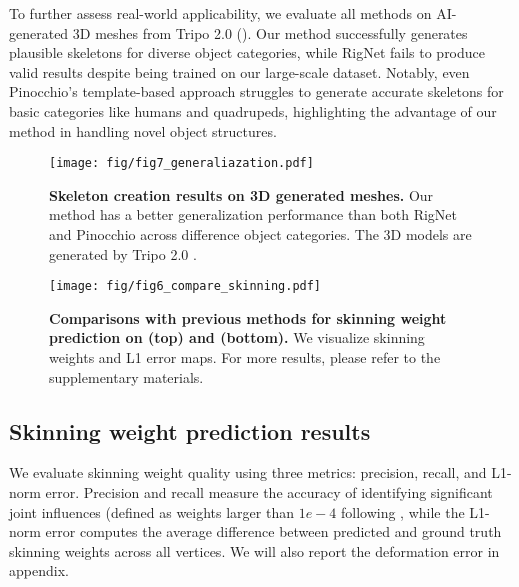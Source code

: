To further assess real-world applicability, we evaluate all methods on AI-generated 3D meshes from Tripo 2.0 \cite{tripo3d} (). 
Our method successfully generates plausible skeletons for diverse object categories, while RigNet fails to produce valid results despite being trained on our large-scale dataset. 
Notably, even Pinocchio's template-based approach struggles to generate accurate skeletons for basic categories like humans and quadrupeds, highlighting the advantage of our method in handling novel object structures.


\begin{figure}
  \centering
  \texttt{[image: fig/fig7\_generaliazation.pdf]}
  \caption{\textbf{Skeleton creation results on 3D generated meshes.} Our method has a better generalization performance than both RigNet \cite{xu2020rignet} and Pinocchio \cite{baran2007automatic} across difference object categories. The 3D models are generated by Tripo 2.0 \cite{tripo3d}.}
  \label{generalization}
\end{figure}


\begin{figure*}
  \centering
  \texttt{[image: fig/fig6\_compare\_skinning.pdf]}
  \caption{\textbf{Comparisons with previous methods for skinning weight prediction on \res{} (top) and \ourdata{} (bottom).} We visualize skinning weights and L1 error maps. For more results, please refer to the supplementary materials.}
  \label{compare_skin}
\end{figure*}

\subsection{Skinning weight prediction results}
We evaluate skinning weight quality using three metrics: precision, recall, and L1-norm error.
Precision and recall measure the accuracy of identifying significant joint influences (defined as weights larger than $1e-4$ following \cite{xu2020rignet}, while the L1-norm error computes the average difference between predicted and ground truth skinning weights across all vertices. We will also report the deformation error in appendix.

